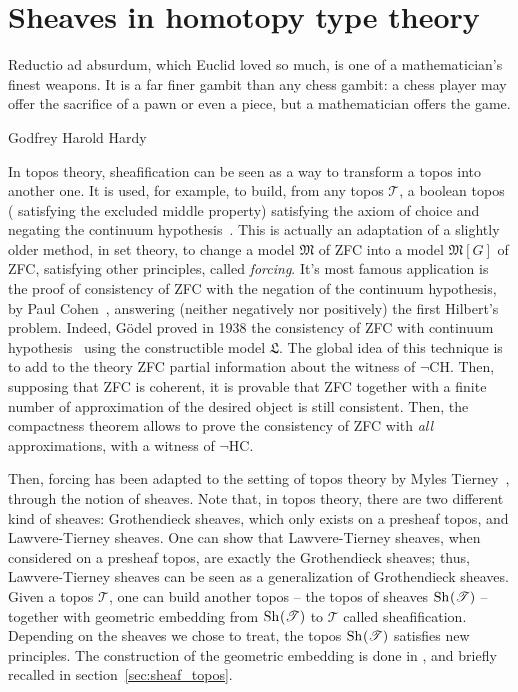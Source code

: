 \chapter{Sheaves in homotopy type theory}
\label{chap:sheaf}
\epigraph{Reductio ad absurdum, which Euclid loved so much, is one of
  a mathematician's finest weapons. It is a far finer gambit than any
  chess gambit: a chess player may offer the sacrifice of a pawn or
  even a piece, but a mathematician offers the game.}{Godfrey Harold Hardy}


In topos theory, sheafification can be seen as a way to transform a
topos into another one. It is used, for example, to build, from any
topos $\mathcal T$, a boolean topos (\ie{} satisfying the excluded
middle property) satisfying the axiom of choice and negating the
continuum hypothesis~\cite[Theorem VI.2.1]{maclanemoerdijk}.
This is actually an adaptation of a slightly older method, in set
theory, to change a model $\mathfrak M$ of ZFC into a model $\mathfrak
M[G]$ of ZFC, satisfying other principles, called {\em forcing}. It's
most famous application is the proof of consistency of ZFC with the
negation of the continuum hypothesis, by Paul Cohen~\cite{cohen1966},
answering (neither negatively nor positively) the first Hilbert's
problem. Indeed, Gödel proved in 1938 the consistency of ZFC with
continuum hypothesis~\cite{godel1938} using the constructible model
$\mathfrak L$.
The global idea of this technique is to add to the theory
ZFC partial information about the witness of $\lnot$CH. 
Then, supposing that ZFC is coherent, it is provable that ZFC together
with a finite number of approximation of the desired object is still
consistent. Then, the compactness theorem allows to prove the
consistency of ZFC with {\em all} approximations, \ie{} with a witness
of $\lnot$HC.

Then, forcing has been adapted to the setting of topos theory by Myles
Tierney~\cite{tierney1972}, through the notion of sheaves.  Note that,
in topos theory, there are two different kind of sheaves: Grothendieck
sheaves, which only exists on a presheaf topos, and Lawvere-Tierney
sheaves. One can show that Lawvere-Tierney sheaves, when considered on
a presheaf topos, are exactly the Grothendieck sheaves; thus,
Lawvere-Tierney sheaves can be seen as a generalization of
Grothendieck sheaves.  Given a topos $\mathcal T$, one can build
another topos -- the topos of sheaves $\mathrm{Sh}_{}(\mathcal T)$ -- together
with geometric embedding from $\mathrm{Sh}_{}(\mathcal T)$ to $\mathcal T$
called sheafification.  Depending on the sheaves we chose to treat,
the topos $\mathrm{Sh}_{}(\mathcal T)$ satisfies new principles. The
construction of the geometric embedding is done in \cite[Section
V.3]{maclanemoerdijk}, and briefly recalled in
section~\ref{sec:sheaf_topos}.

